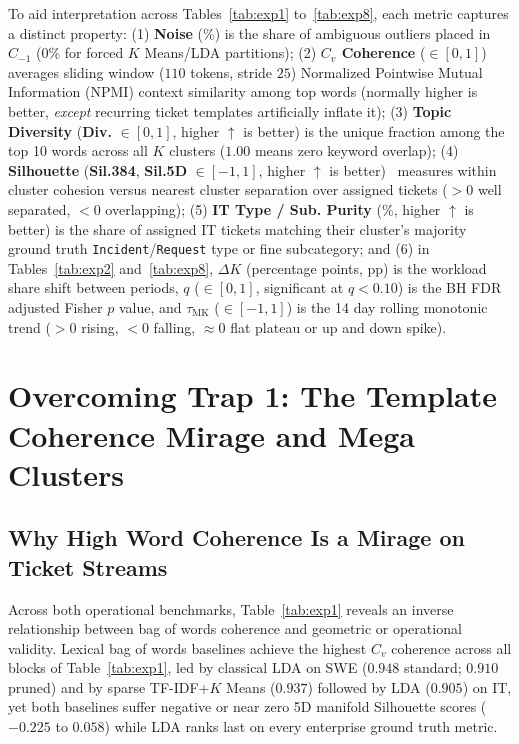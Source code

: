 \documentclass[sigconf,nonacm,pbalance]{acmart}
\begin{document}
To aid interpretation across Tables~\ref{tab:exp1} to~\ref{tab:exp8}, each metric captures a distinct property: (1) \textbf{Noise} ($\%$) is the share of ambiguous outliers placed in $C_{-1}$ ($0\%$ for forced $K$ Means/LDA partitions); (2) \textbf{$C_v$ Coherence} ($\in [0, 1]$)~\cite{newman2010automatic, roder2015exploring} averages sliding window ($110$ tokens, stride $25$) Normalized Pointwise Mutual Information (NPMI) context similarity among top words (normally higher is better, \emph{except} recurring ticket templates artificially inflate it); (3) \textbf{Topic Diversity} (\textbf{Div.} $\in [0, 1]$, higher $\uparrow$ is better) is the unique fraction among the top 10 words across all $K$ clusters ($1.00$ means zero keyword overlap); (4) \textbf{Silhouette} (\textbf{Sil.384}, \textbf{Sil.5D} $\in [-1, 1]$, higher $\uparrow$ is better)~\cite{rousseeuw1987silhouettes} measures within cluster cohesion versus nearest cluster separation over assigned tickets ($>0$ well separated, $<0$ overlapping); (5) \textbf{IT Type / Sub. Purity} ($\%$, higher $\uparrow$ is better) is the share of assigned IT tickets matching their cluster's majority ground truth \texttt{Incident}/\texttt{Request} type or fine subcategory; and (6) in Tables~\ref{tab:exp2} and~\ref{tab:exp8}, \textbf{$\Delta K$} (percentage points, pp) is the workload share shift between periods, \textbf{$q$} ($\in [0, 1]$, significant at $q < 0.10$) is the BH FDR adjusted Fisher $p$ value, and \textbf{$\tau_{\text{MK}}$} ($\in [-1, 1]$) is the 14 day rolling monotonic trend ($>0$ rising, $<0$ falling, $\approx 0$ flat plateau or up and down spike).

\section{Overcoming Trap 1: The Template Coherence Mirage and Mega Clusters}

\subsection{Why High Word Coherence Is a Mirage on Ticket Streams}
Across both operational benchmarks, Table~\ref{tab:exp1} reveals an inverse relationship between bag of words coherence and geometric or operational validity. Lexical bag of words baselines achieve the highest $C_v$ coherence across all blocks of Table~\ref{tab:exp1}, led by classical LDA on SWE ($0.948$ standard; $0.910$ pruned) and by sparse TF-IDF+$K$ Means ($0.937$) followed by LDA ($0.905$) on IT, yet both baselines suffer negative or near zero 5D manifold Silhouette scores ($-0.225$ to $0.058$) while LDA ranks last on every enterprise ground truth metric.
\end{document}
